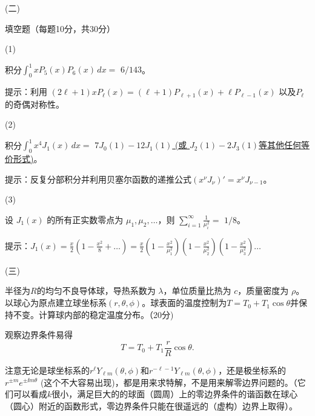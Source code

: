 \documentclass[12pt,CJK]{article}
\begin{document}
\item[(二)]{填空题（每题10分，共30分）
  \bitem
\item[(1)]{积分$\int_0^1 xP_5(x)P_6(x)\,dx = $ \underline{\blue $ 6/143 $}。

{\red 提示：利用 $(2\ell+1)xP_{\ell}(x) = (\ell+1)P_{\ell+1}(x) + \ell P_{\ell-1}(x)$ 以及$P_{\ell}$的奇偶对称性。}}
\item[(2)]{积分$\int_0^1 x^4J_1(x)\, dx = $ \underline{\blue $7J_0(1)-12J_1(1)$ (或 $J_2(1)-2J_3(1)$等其他任何等价形式)}。

{\red 提示：反复分部积分并利用贝塞尔函数的递推公式$(x^\nu J_\nu)' = x^\nu J_{\nu-1}$。}
}    
\item[(3)]{设 $J_{1}(x)$ 的所有正实数零点为 $\mu_1,\mu_2,\ldots$，则 $\sum_{i=1}^\infty \frac{1}{\mu_i^2} = $ \underline{\blue $1/8$}。

{\red 提示：$J_1(x) = \frac{x}{2}\left(1-\frac{x^2}{8}+\ldots\right) = \frac{x}{2}\left(1-\frac{x^2}{\mu_1^2}\right)\left(1-\frac{x^2}{\mu_2^2}\right)\left(1-\frac{x^2}{\mu_3^2}\right)\ldots$} }
  \eitem
}
  
\item[(三)]{半径为$R$的均匀不良导体球，导热系数为 $\lambda$，单位质量比热为 $c$，质量密度为 $\rho$。以球心为原点建立球坐标系$(r,\theta,\phi)$。球表面的温度控制为$T = T_0+T_1 \cos\theta$并保持不变。计算球内部的稳定温度分布。（20分)

    {\blue 观察边界条件易得$$T = T_0 + T_1\frac{r}{R}\cos\theta.$$

      \skiplines

      注意无论是球坐标系的$r^\ell Y_{\ell m}(\theta,\phi)$和$r^{-\ell-1} Y_{\ell m}(\theta,\phi)$，还是极坐标系的$r^{\pm m}e^{\pm \ii m\theta}$ (这个不大容易出现)，都是用来求特解，不是用来解零边界问题的。（它们可以看成$k$很小，满足巨大的的球面（圆周）上的零边界条件的谐函数在球心（圆心）附近的函数形式，零边界条件只能在很遥远的（虚构）边界上取得）。
    }
}
\end{document}
